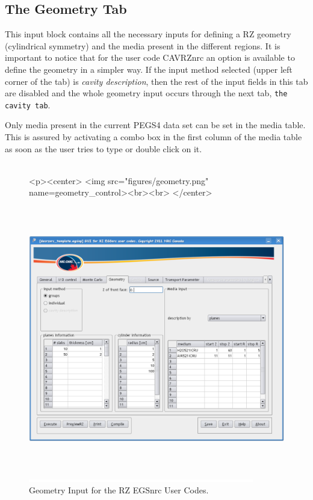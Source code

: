 \documentclass[12pt,twoside]{article}   %
\begin{document}
\newpage
\subsection{The Geometry Tab}

This input block contains all the necessary inputs for defining a RZ geometry (cylindrical symmetry) 
and the media present in the different regions. It is important to notice that for the user code 
CAVRZnrc an option is available to define the geometry in a simpler way. If the input method selected
(upper left corner of the tab) is {\em cavity description}, then the rest of the input fields in this 
tab are disabled and the whole geometry input occurs through the next tab, {\tt the cavity tab}.

Only media present in the current PEGS4 data set can be set in the media table. This is assured by
activating a combo box in the first column of the media table as soon as the user tries to type
or double click on it. \\ \\

\begin{figure}[htb]
\begin{htmlonly}
\begin{rawhtml}
<p><center>
<img src="figures/geometry.png" name=geometry_control><br><br>
</center>
\end{rawhtml}
\end{htmlonly}
\begin{latexonly}
\begin{center}
\includegraphics[height=11.56cm]{figures/geometry}
\end{center}
\end{latexonly}
\begin{center}
\includegraphics[height=1mm]{figures/fake2}
\end{center}
\caption{Geometry Input for the RZ EGSnrc User Codes.}
\label{geometry_control}
\end{figure}
\end{document}
